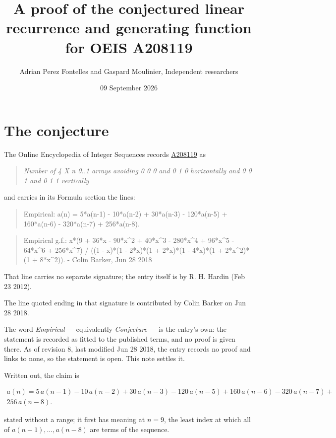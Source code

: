 \documentclass[11pt]{article}
\title{A proof of the conjectured linear recurrence and generating function for OEIS A208119}
\author{Adrian Perez Fontelles and Gaspard Moulinier, Independent researchers}
\date{09 September 2026}
\theoremstyle{definition}
\begin{document}
\maketitle
\section{The conjecture}

The Online Encyclopedia of Integer Sequences records \href{https://oeis.org/A208119}{A208119} as

\begin{quote}\itshape Number of 4 X n 0..1 arrays avoiding 0 0 0 and 0 1 0 horizontally and 0 0 1 and 0 1 1 vertically\end{quote}

and carries in its Formula section the lines:

\begin{quote}\ttfamily Empirical: a(n) = 5*a(n-1) - 10*a(n-2) + 30*a(n-3) - 120*a(n-5) + 160*a(n-6) - 320*a(n-7) + 256*a(n-8).\end{quote}

\begin{quote}\ttfamily Empirical g.f.: x*(9 + 36*x - 90*x\textasciicircum{}2 + 40*x\textasciicircum{}3 - 280*x\textasciicircum{}4 + 96*x\textasciicircum{}5 - 64*x\textasciicircum{}6 + 256*x\textasciicircum{}7) / ((1 - x)*(1 - 2*x)*(1 + 2*x)*(1 - 4*x)*(1 + 2*x\textasciicircum{}2)*(1 + 8*x\textasciicircum{}2)). - Colin Barker, Jun 28 2018\end{quote}

That line carries no separate signature; the entry itself is by R. H. Hardin (Feb 23 2012).

The line quoted ending in that signature is contributed by Colin Barker on Jun 28 2018.

The word {\itshape Empirical} --- equivalently {\itshape Conjecture} --- is the entry's own: the statement is recorded as fitted to the published terms, and no proof is given there. As of revision 8, last modified Jun 28 2018, the entry records no proof and links to none, so the statement is open. This note settles it.

Written out, the claim is

\begin{multline*} a(n) = 5\,a(n-1) - 10\,a(n-2) + 30\,a(n-3) - 120\,a(n-5) + 160\,a(n-6) - 320\,a(n-7) + \\ 256\,a(n-8). \end{multline*}

stated without a range; it first has meaning at $n = 9$, the least index at which all of $a(n-1),\dots,a(n-8)$ are terms of the sequence.
\end{document}
